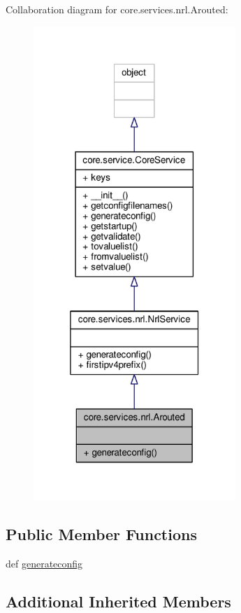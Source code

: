 Collaboration diagram for core.\+services.\+nrl.\+Arouted\+:
\nopagebreak
\begin{figure}[H]
\begin{center}
\leavevmode
\includegraphics[width=217pt]{classcore_1_1services_1_1nrl_1_1_arouted__coll__graph}
\end{center}
\end{figure}
\subsection*{Public Member Functions}
\begin{DoxyCompactItemize}
\item 
def \hyperlink{classcore_1_1services_1_1nrl_1_1_arouted_a7f706c37edb10d2bb67e3e4cdd66210d}{generateconfig}
\end{DoxyCompactItemize}
\subsection*{Additional Inherited Members}


